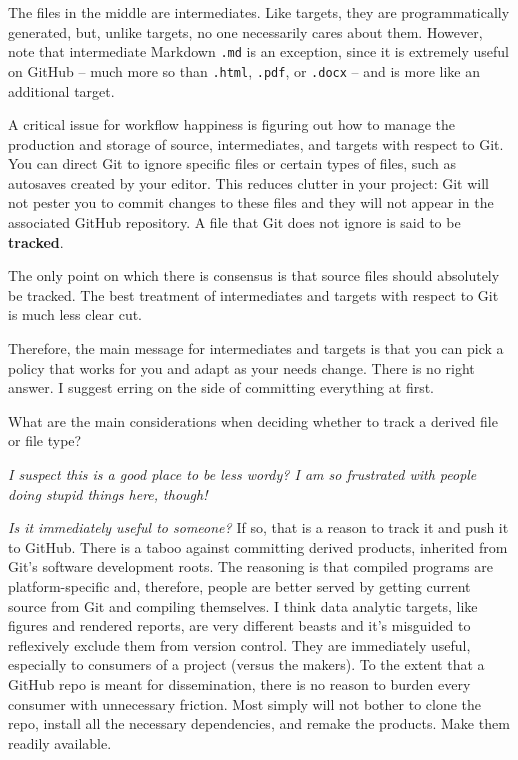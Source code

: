 \documentclass[12pt]{article}
\begin{document}
The files in the middle are intermediates. Like targets, they are
programmatically generated, but, unlike targets, no one necessarily
cares about them. However, note that intermediate Markdown \texttt{.md}
is an exception, since it is extremely useful on GitHub -- much more so
than \texttt{.html}, \texttt{.pdf}, or \texttt{.docx} -- and is more
like an additional target.

A critical issue for workflow happiness is figuring out how to manage
the production and storage of source, intermediates, and targets with
respect to Git. You can direct Git to ignore specific files or certain
types of files, such as autosaves created by your editor. This reduces
clutter in your project: Git will not pester you to commit changes to
these files and they will not appear in the associated GitHub
repository. A file that Git does not ignore is said to be
\textbf{tracked}.

The only point on which there is consensus is that source files should
absolutely be tracked. The best treatment of intermediates and targets
with respect to Git is much less clear cut.

Therefore, the main message for intermediates and targets is that you
can pick a policy that works for you and adapt as your needs change.
There is no right answer. I suggest erring on the side of committing
everything at first.

What are the main considerations when deciding whether to track a
derived file or file type?

\emph{I suspect this is a good place to be less wordy? I am so
frustrated with people doing stupid things here, though!}

\emph{Is it immediately useful to someone?} If so, that is a reason to
track it and push it to GitHub. There is a taboo against committing
derived products, inherited from Git's software development roots. The
reasoning is that compiled programs are platform-specific and,
therefore, people are better served by getting current source from Git
and compiling themselves. I think data analytic targets, like figures
and rendered reports, are very different beasts and it's misguided to
reflexively exclude them from version control. They are immediately
useful, especially to consumers of a project (versus the makers). To the
extent that a GitHub repo is meant for dissemination, there is no reason
to burden every consumer with unnecessary friction. Most simply will not
bother to clone the repo, install all the necessary dependencies, and
remake the products. Make them readily available.
\end{document}
